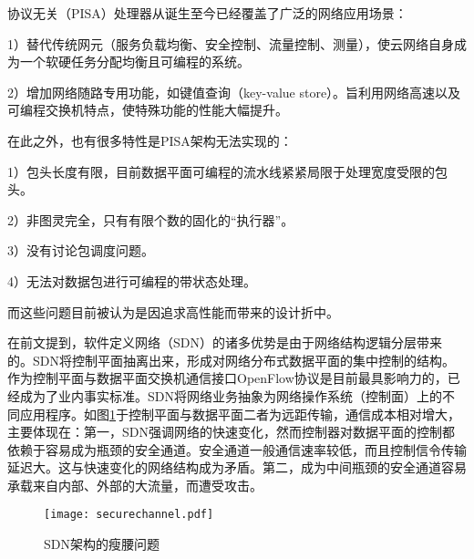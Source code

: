 
协议无关（PISA）处理器从诞生至今已经覆盖了广泛的网络应用场景：

1）替代传统网元（服务负载均衡、安全控制、流量控制、测量），使云网络自身成为一个软硬任务分配均衡且可编程的系统。

2）增加网络随路专用功能，如键值查询（key-value store）。旨利用网络高速以及可编程交换机特点，使特殊功能的性能大幅提升。

在此之外，也有很多特性是PISA架构无法实现的：

1）包头长度有限，目前数据平面可编程的流水线紧紧局限于处理宽度受限的包头。

2）非图灵完全，只有有限个数的固化的“执行器”。

3）没有讨论包调度问题。

4）无法对数据包进行可编程的带状态处理。

而这些问题目前被认为是因追求高性能而带来的设计折中。









在前文提到，软件定义网络（SDN）的诸多优势是由于网络结构逻辑分层带来的。SDN将控制平面抽离出来，形成对网络分布式数据平面的集中控制的结构。作为控制平面与数据平面交换机通信接口OpenFlow协议是目前最具影响力的，已经成为了业内事实标准。SDN将网络业务抽象为网络操作系统（控制面）上的不同应用程序。如图\ref{fig:securechannel}于控制平面与数据平面二者为远距传输，通信成本相对增大，主要体现在：第一，SDN强调网络的快速变化，然而控制器对数据平面的控制都依赖于容易成为瓶颈的安全通道。安全通道一般通信速率较低，而且控制信令传输延迟大。这与快速变化的网络结构成为矛盾。第二，成为中间瓶颈的安全通道容易承载来自内部、外部的大流量，而遭受攻击。

\begin{figure}[!ht]
	\centering
	\texttt{[image: securechannel.pdf]}
	\caption{SDN架构的瘦腰问题} \label{fig:securechannel}
\end{figure}

